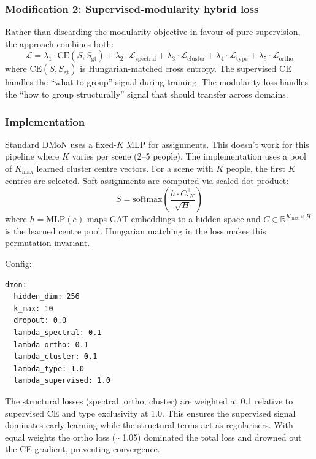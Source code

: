 \subsubsection{Modification 2: Supervised-modularity hybrid loss}

Rather than discarding the modularity objective in favour of pure supervision, the approach combines both:
\begin{equation}
\mathcal{L} = \lambda_1 \cdot \text{CE}(S, S_{\text{gt}}) + \lambda_2 \cdot \mathcal{L}_{\text{spectral}} + \lambda_3 \cdot \mathcal{L}_{\text{cluster}} + \lambda_4 \cdot \mathcal{L}_{\text{type}} + \lambda_5 \cdot \mathcal{L}_{\text{ortho}}
\end{equation}
where $\text{CE}(S, S_{\text{gt}})$ is Hungarian-matched cross entropy. The supervised CE handles the ``what to group'' signal during training. The modularity loss handles the ``how to group structurally'' signal that should transfer across domains.


\subsubsection{Implementation}

Standard DMoN uses a fixed-$K$ MLP for assignments. This doesn't work for this pipeline where $K$ varies per scene (2--5 people). The implementation uses a pool of $K_{\text{max}}$ learned cluster centre vectors. For a scene with $K$ people, the first $K$ centres are selected. Soft assignments are computed via scaled dot product:
\begin{equation}
S = \text{softmax}\left(\frac{h \cdot C_{:K}^\top}{\sqrt{H}}\right)
\end{equation}
where $h = \text{MLP}(e)$ maps GAT embeddings to a hidden space and $C \in \mathbb{R}^{K_{\text{max}} \times H}$ is the learned centre pool. Hungarian matching in the loss makes this permutation-invariant.

Config:
\begin{verbatim}
dmon:
  hidden_dim: 256
  k_max: 10
  dropout: 0.0
  lambda_spectral: 0.1
  lambda_ortho: 0.1
  lambda_cluster: 0.1
  lambda_type: 1.0
  lambda_supervised: 1.0
\end{verbatim}

The structural losses (spectral, ortho, cluster) are weighted at 0.1 relative to supervised CE and type exclusivity at 1.0. This ensures the supervised signal dominates early learning while the structural terms act as regularisers. With equal weights the ortho loss ($\sim$1.05) dominated the total loss and drowned out the CE gradient, preventing convergence.


